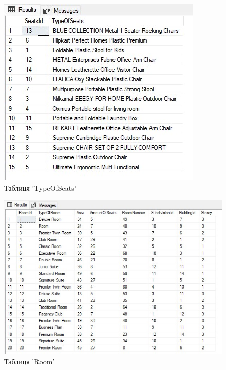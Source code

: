 \documentclass[a4paper,12pt]{article}
\begin{document}
\newpage
	\begin{figure}[h!]
		\centering
		\begin{minipage}[h]{1\linewidth}
			\includegraphics[width=0.8\linewidth]{Prt sc/Figure_4.jpg}  
		\end{minipage}
		\caption{Таблиця 'TypeOfSeats'}
	\end{figure}
	
	\begin{figure}[h!]
		\centering
		\begin{minipage}[h]{1\linewidth}
			\includegraphics[width=0.8\linewidth]{Prt sc/Figure_5.jpg}  
		\end{minipage}
		\caption{Таблиця 'Room'}
	\end{figure}
	
\end{document}
